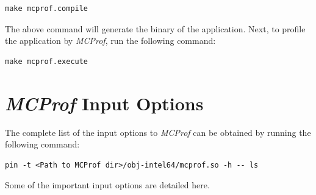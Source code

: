 \documentclass[10pt]{article}
\newcommand{\MCPROF}{\emph{MCProf}}
\begin{document}
{
\small
\begin{Verbatim}[frame=single]
make mcprof.compile
\end{Verbatim}
}

The above command will generate the binary of the application. Next, to profile
the application by \MCPROF{}, run the following command:

{
\small
\begin{Verbatim}[frame=single]
make mcprof.execute
\end{Verbatim}
}


\section{\MCPROF{} Input Options}
\label{sec:inputopt}

The complete list of the input options to \MCPROF{} can be obtained by running
the following command:

{
\small
\begin{Verbatim}[frame=single]
pin -t <Path to MCProf dir>/obj-intel64/mcprof.so -h -- ls
\end{Verbatim}
}

Some of the important input options are detailed here.
\end{document}
